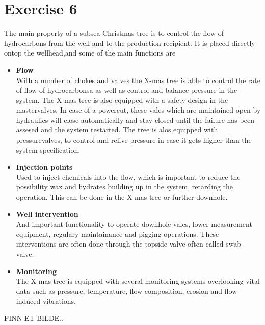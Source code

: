 \documentclass[a4paper,norsk]{article}
\begin{document}
\section*{Exercise 6}
The main property of a subsea Christmas tree is to control the flow of hydrocarbons from the well and to the production recipient. It is placed directly ontop the wellhead,and some of the main functions are

\begin{itemize}
\item \textbf{Flow} \\
With a number of chokes and valves the X-mas tree is able to control the rate of flow of hydrocarbonsa as well as control and balance pressure in the system. The X-mas tree is also equipped with a safety design in the mastervalves. In case of a powercut, these vales which are maintained open by hydraulics will close automatically and stay closed until the failure has been assesed and the system restarted. The tree is alos equipped with pressurevalves, to control and relive pressure in case it gets higher than the system specification.

\item \textbf{Injection points} \\
Used to inject chemicals into the flow, which is important to reduce the possibility wax and hydrates building up in the system, retarding the operation. This can be done in the X-mas tree or further downhole.

\item \textbf{Well intervention} \\
And important functionality to operate downhole vales, lower measurement equipment, regulary maintainance and pigging operations. These interventions are often done through the topside valve often called swab valve. 
\item \textbf{Monitoring} \\
The X-mas tree is equipped with several monitoring systems overlooking vital data such as pressure, temperature, flow composition, erosion and flow induced vibrations. 
\end{itemize}
FINN ET BILDE..
\end{document}
